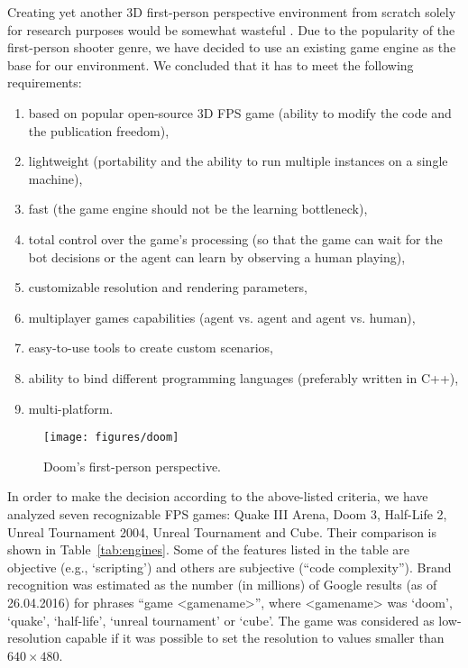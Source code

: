 \documentclass[english,american,conference, balance]{IEEEtran}
\begin{document}
Creating yet another 3D first-person perspective environment from
scratch solely for research purposes would be somewhat wasteful \cite{trenholme2008computer}.
Due to the popularity of the first-person shooter genre, we have decided
to use an existing game engine as the base for our environment. We
concluded that it has to meet the following requirements:
\begin{enumerate}
\item based on popular open-source 3D FPS game (ability to modify the code
and the publication freedom),
\item lightweight (portability and the ability to run multiple instances
on a single machine),
\item fast (the game engine should not be the learning bottleneck),
\item total control over the game's processing (so that the game can wait
for the bot decisions or the agent can learn by observing a human
playing),
\item customizable resolution and rendering parameters,
\item multiplayer games capabilities (agent vs. agent and agent vs. human),
\item easy-to-use tools to create custom scenarios,
\item ability to bind different programming languages (preferably written
in C++),
\item multi-platform.
\end{enumerate}
\begin{figure}
\centering{}\texttt{[image: figures/doom]}
\caption{\label{fig:doom}Doom's first-person perspective.}
\end{figure}

In order to make the decision according to the above-listed criteria,
we have analyzed seven recognizable FPS games: Quake III Arena, Doom
3, Half-Life 2, Unreal Tournament 2004, Unreal Tournament and Cube.
Their comparison is shown in Table~\ref{tab:engines}. Some of the
features listed in the table are objective (e.g., `scripting') and
others are subjective (``code complexity''). Brand recognition was
estimated as the number (in millions) of Google results (as of 26.04.2016)
for phrases ``game \textless{}gamename\textgreater{}'', where \textless{}gamename\textgreater{}
was `doom', `quake', `half-life', `unreal tournament' or `cube'. The
game was considered as low-resolution capable if it was possible to
set the resolution to values smaller than $640\times480$.
\end{document}
